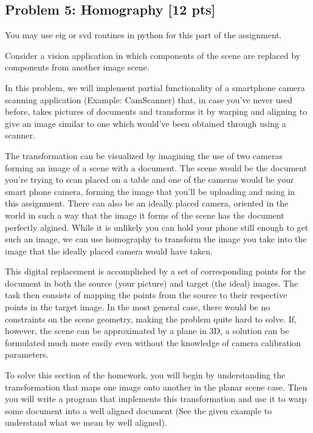 \documentclass[11pt]{article}
\begin{document}
    \hypertarget{problem-5-homography-12-pts}{%
\subsection{Problem 5: Homography {[}12
pts{]}}\label{problem-5-homography-12-pts}}

You may use eig or svd routines in python for this part of the
assignment.

Consider a vision application in which components of the scene are
replaced by components from another image scene.

In this problem, we will implement partial functionality of a smartphone
camera scanning application (Example: CamScanner) that, in case you've
never used before, takes pictures of documents and transforms it by
warping and aligning to give an image similar to one which would've been
obtained through using a scanner.

The transformation can be visualized by imagining the use of two cameras
forming an image of a scene with a document. The scene would be the
document you're trying to scan placed on a table and one of the cameras
would be your smart phone camera, forming the image that you'll be
uploading and using in this assignment. There can also be an ideally
placed camera, oriented in the world in such a way that the image it
forms of the scene has the document perfectly algined. While it is
unlikely you can hold your phone still enough to get such an image, we
can use homography to transform the image you take into the image that
the ideally placed camera would have taken.

This digital replacement is accomplished by a set of corresponding
points for the document in both the source (your picture) and target
(the ideal) images. The task then consists of mapping the points from
the source to their respective points in the target image. In the most
general case, there would be no constraints on the scene geometry,
making the problem quite hard to solve. If, however, the scene can be
approximated by a plane in 3D, a solution can be formulated much more
easily even without the knowledge of camera calibration parameters.

To solve this section of the homework, you will begin by understanding
the transformation that maps one image onto another in the planar scene
case. Then you will write a program that implements this transformation
and use it to warp some document into a well aligned document (See the
given example to understand what we mean by well aligned).
\end{document}

